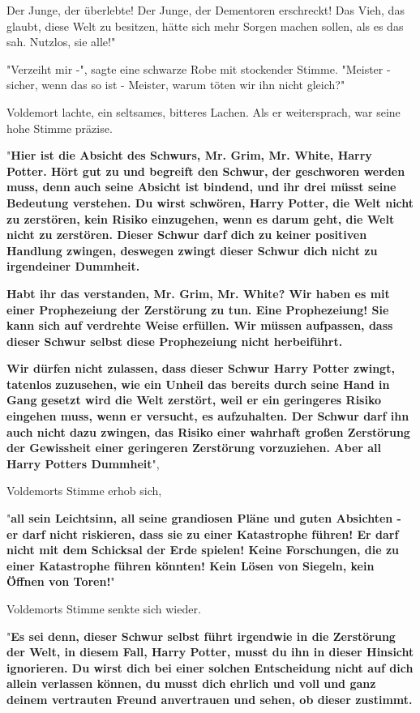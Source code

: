 {{Der Junge, der überlebte! Der Junge, der Dementoren erschreckt! Das Vieh, das glaubt, diese Welt zu besitzen, hätte sich mehr Sorgen machen sollen, als es das sah. Nutzlos, sie alle!}"

"Verzeiht mir -", sagte eine schwarze Robe mit stockender Stimme. "Meister - sicher, wenn das so ist - Meister, warum töten wir ihn nicht gleich?"

Voldemort lachte, ein seltsames, bitteres Lachen. Als er weitersprach, war seine hohe Stimme präzise.

"\textbf{Hier ist die Absicht des Schwurs, Mr. Grim, Mr. White, Harry Potter. Hört gut zu und begreift den Schwur, der geschworen werden muss, denn auch seine Absicht ist bindend, und ihr drei müsst seine Bedeutung verstehen. Du wirst schwören, Harry Potter, die Welt nicht zu zerstören, kein Risiko einzugehen, wenn es darum geht, die Welt nicht zu zerstören. Dieser Schwur darf dich zu keiner positiven Handlung zwingen, deswegen zwingt dieser Schwur dich nicht zu irgendeiner Dummheit.}

\textbf{Habt ihr das verstanden, Mr. Grim, Mr. White? Wir haben es mit einer Prophezeiung der Zerstörung zu tun. Eine Prophezeiung! Sie kann sich auf verdrehte Weise erfüllen. Wir müssen aufpassen, dass dieser Schwur selbst diese Prophezeiung nicht herbeiführt.}

\textbf{Wir dürfen nicht zulassen, dass dieser Schwur Harry Potter zwingt, tatenlos} \textbf{zuzusehen, wie ein Unheil das bereits durch seine Hand in Gang gesetzt wird die Welt zerstört, weil er ein geringeres Risiko eingehen muss, wenn er versucht, es aufzuhalten. Der Schwur darf ihn auch nicht dazu zwingen, das Risiko einer wahrhaft großen Zerstörung der Gewissheit einer geringeren Zerstörung vorzuziehen. Aber all Harry Potters Dummheit}",

Voldemorts Stimme erhob sich,

"\textbf{all sein Leichtsinn, all seine grandiosen Pläne und guten Absichten - er darf nicht riskieren, dass sie zu einer Katastrophe führen! Er darf nicht mit dem Schicksal der Erde spielen! Keine Forschungen, die zu einer Katastrophe führen könnten! Kein Lösen von Siegeln, kein Öffnen von Toren!}"

Voldemorts Stimme senkte sich wieder.

"\textbf{Es sei denn, dieser Schwur selbst führt irgendwie in die Zerstörung der Welt, in diesem Fall, Harry Potter, musst du ihn in dieser Hinsicht ignorieren. Du wirst dich bei einer solchen Entscheidung nicht auf dich allein verlassen können, du musst dich ehrlich und voll und ganz deinem vertrauten Freund anvertrauen und sehen, ob dieser zustimmt.}

}
